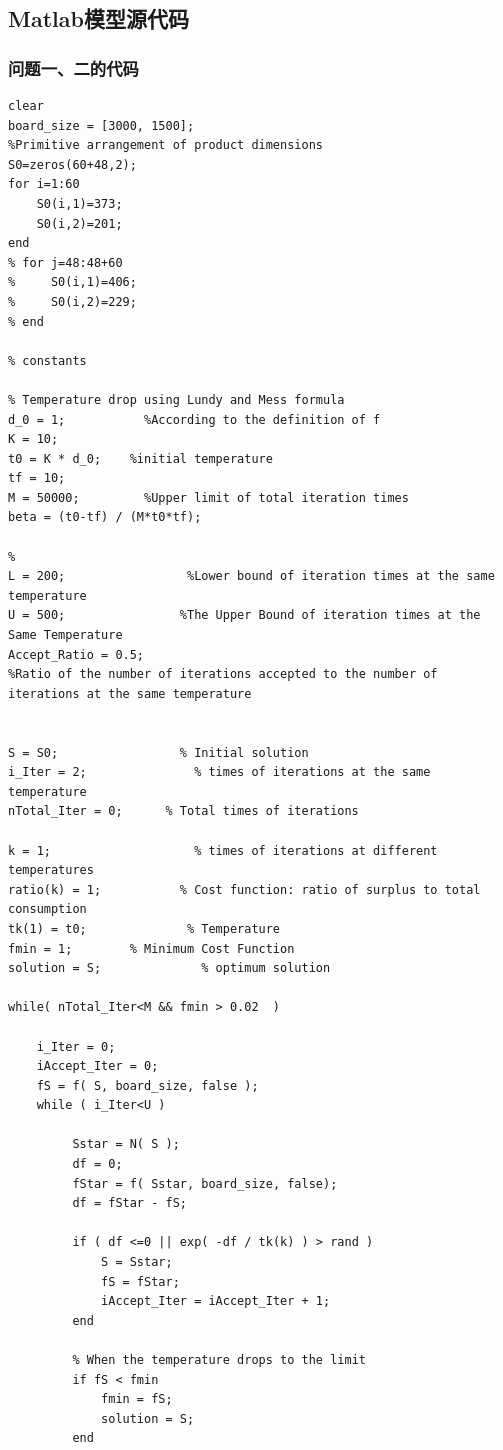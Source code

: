 \documentclass[hyperref,UTF8]{article}
\begin{document}
{\begin{table}[htbp]
\end{table}%
\newpage
\subsection{Matlab模型源代码}
\subsubsection{问题一、二的代码}
\begin{lstlisting}
clear
board_size = [3000, 1500];
%Primitive arrangement of product dimensions
S0=zeros(60+48,2);
for i=1:60
    S0(i,1)=373;
    S0(i,2)=201;
end
% for j=48:48+60
%     S0(i,1)=406;
%     S0(i,2)=229;
% end

% constants

% Temperature drop using Lundy and Mess formula
d_0 = 1;           %According to the definition of f
K = 10;
t0 = K * d_0;    %initial temperature
tf = 10;
M = 50000;         %Upper limit of total iteration times
beta = (t0-tf) / (M*t0*tf);

%
L = 200;                 %Lower bound of iteration times at the same temperature
U = 500;                %The Upper Bound of iteration times at the Same Temperature
Accept_Ratio = 0.5;
%Ratio of the number of iterations accepted to the number of iterations at the same temperature


S = S0;                 % Initial solution
i_Iter = 2;               % times of iterations at the same temperature
nTotal_Iter = 0;      % Total times of iterations

k = 1;                    % times of iterations at different temperatures
ratio(k) = 1;           % Cost function: ratio of surplus to total consumption
tk(1) = t0;              % Temperature
fmin = 1;        % Minimum Cost Function
solution = S;              % optimum solution

while( nTotal_Iter<M && fmin > 0.02  )

    i_Iter = 0;
    iAccept_Iter = 0;
    fS = f( S, board_size, false );
    while ( i_Iter<U )

         Sstar = N( S );
         df = 0;
         fStar = f( Sstar, board_size, false);
         df = fStar - fS;

         if ( df <=0 || exp( -df / tk(k) ) > rand )
             S = Sstar;
             fS = fStar;
             iAccept_Iter = iAccept_Iter + 1;
         end

         % When the temperature drops to the limit
         if fS < fmin
             fmin = fS;
             solution = S;
         end


\end{lstlisting}}
\end{document}
